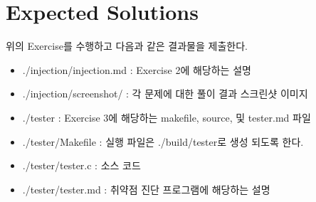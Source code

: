 \documentclass[a4paper, 11pt]{article}
\theoremstyle{definition}
\begin{document}
\section{Expected Solutions}

위의 Exercise를 수행하고 다음과 같은 결과물을 제출한다. 

\begin{itemize}
	\item ./injection/injection.md : Exercise 2에 해당하는 설명 
  \item ./injection/screenshot/ : 각 문제에 대한 풀이 결과 스크린샷 이미지 

	\item ./tester : Exercise 3에 해당하는 makefile, source, 및 tester.md 파일 
	\item ./tester/Makefile : 실행 파일은 ./build/tester로 생성 되도록 한다. 
	\item ./tester/tester.c :  소스 코드 
	\item ./tester/tester.md  : 취약점 진단 프로그램에 해당하는 설명 
\end{itemize}



\end{document}

